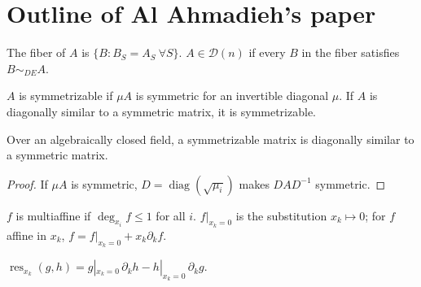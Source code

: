 
\chapter{Outline of Al Ahmadieh's paper}

\begin{definition}
\label{def:fiber}
\leanok
{}
The fiber of $A$ is $\{B: B_S=A_S\ \forall S\}$. $A\in\mathcal D(n)$ if every $B$ in the fiber
satisfies $B\sim_{DE}A$.
\end{definition}

\begin{definition}[Symmetrizable]
\label{def:symmetrizable}
\leanok
{}
$A$ is symmetrizable if $\mu A$ is symmetric for an invertible diagonal $\mu$. If $A$ is
diagonally similar to a symmetric matrix, it is symmetrizable.
\end{definition}

\begin{lemma}
\label{lem:symmetrizable-alg-closed}
\leanok
{}
Over an algebraically closed field, a symmetrizable matrix is diagonally similar to a
symmetric matrix.
\end{lemma}

\begin{proof}
If $\mu A$ is symmetric, $D=\operatorname{diag}(\sqrt{\mu_i})$ makes $DAD^{-1}$ symmetric.
\end{proof}

\begin{definition}
\label{def:multiaffine}
\leanok
$f$ is multiaffine if $\deg_{x_i}f\le1$ for all $i$. $f|_{x_k=0}$ is the substitution
$x_k\mapsto0$; for $f$ affine in $x_k$, $f=f|_{x_k=0}+x_k\partial_kf$.
\end{definition}

\begin{definition}[Resultant]
\label{def:res}
\leanok
{}
$\operatorname{res}_{x_k}(g,h)=g|_{x_k=0}\,\partial_kh-h|_{x_k=0}\,\partial_kg$.
\end{definition}

